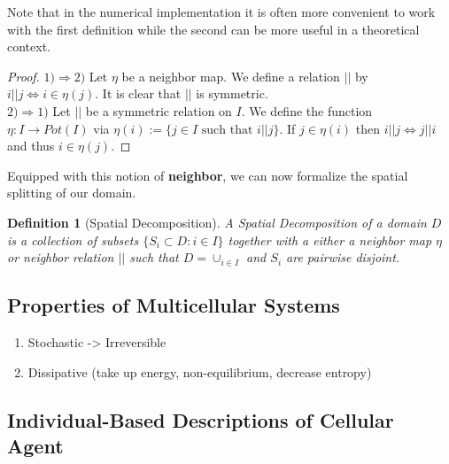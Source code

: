 \documentclass{article}
\newtheorem{definition}{Definition}[section]
\begin{document}
Note that in the numerical implementation it is often more convenient to work with the first
definition while the second can be more useful in a theoretical context.

\begin{proof}
    $1) \Rightarrow 2)$ Let $\eta$ be a neighbor map.
    We define a relation $||$ by $i||j \Leftrightarrow i\in\eta(j)$.
    It is clear that $||$ is symmetric.\\
    $2) \Rightarrow 1)$ Let $||$ be a symmetric relation on $I$.
    We define the function $\eta:I\rightarrow Pot(I)$ via
    $\eta(i):=\{j\in I \text{ such that } i||j\}$.
    If $j\in\eta(i)$ then $i||j \Leftrightarrow j||i$ and thus $i\in\eta(j)$.
\end{proof}

Equipped with this notion of \textbf{neighbor}, we can now formalize the spatial splitting of our
domain.

\begin{definition}[Spatial Decomposition]
    A Spatial Decomposition of a domain $D$ is a collection of subsets
    $\{S_i\subset D: i\in I\}$ together with a either a neighbor map $\eta$ or neighbor relation
    $||$ such that $D=\cup_{i\in I}$ and $S_i$ are pairwise disjoint.
\end{definition}

\subsection{Properties of Multicellular Systems}
\label{subsection:properties}

\begin{enumerate}
    \item Stochastic -> Irreversible
    \item Dissipative (take up energy, non-equilibrium, decrease entropy)
\end{enumerate}

\subsection{Individual-Based Descriptions of Cellular Agent}
\label{subsection:individual-descriptions}
\end{document}

